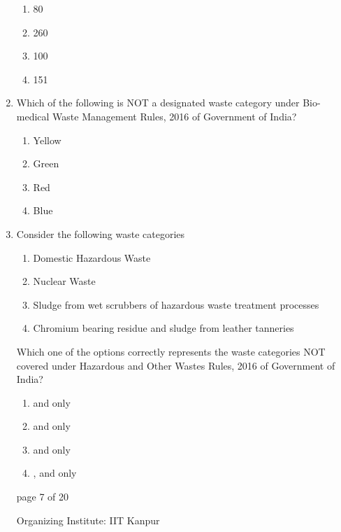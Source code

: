 \documentclass[journal,12pt,onecolumn]{IEEEtran}
\theoremstyle{remark}
\begin{document}
\begin{enumerate}[start=1, label={Q\arabic*.}]
\begin{enumerate}[label=(\Alph*)]
\item 80
\item 260
\item 100
\item 151
\end{enumerate}
\hfill{}

\item Which of the following is NOT a designated waste category under Bio-medical Waste Management Rules, 2016 of Government of India?

\begin{enumerate}[label=(\Alph*)]
\item Yellow
\item Green
\item Red
\item Blue
\end{enumerate}
\hfill{}

\item Consider the following waste categories

\begin{enumerate}[label=\roman*.]
\item Domestic Hazardous Waste
\item Nuclear Waste
\item Sludge from wet scrubbers of hazardous waste treatment processes
\item Chromium bearing residue and sludge from leather tanneries
\end{enumerate}

Which one of the options correctly represents the waste categories NOT covered under Hazardous and Other Wastes  Rules, 2016 of Government of India?

\begin{enumerate}[label=(\Alph*)]
\item {} and  only
\item {} and  only
\item {} and  only
\item {},  and  only
\end{enumerate}
\hfill{}
\vfill
\begin{center}
{\Large page 7 of 20}
\end{center}
\RaggedRight
{\color{orange}
{\Large Organizing Institute: IIT Kanpur}}
\newpage
\begin{figure}
    

\end{figure}
\end{enumerate}
\end{document}
